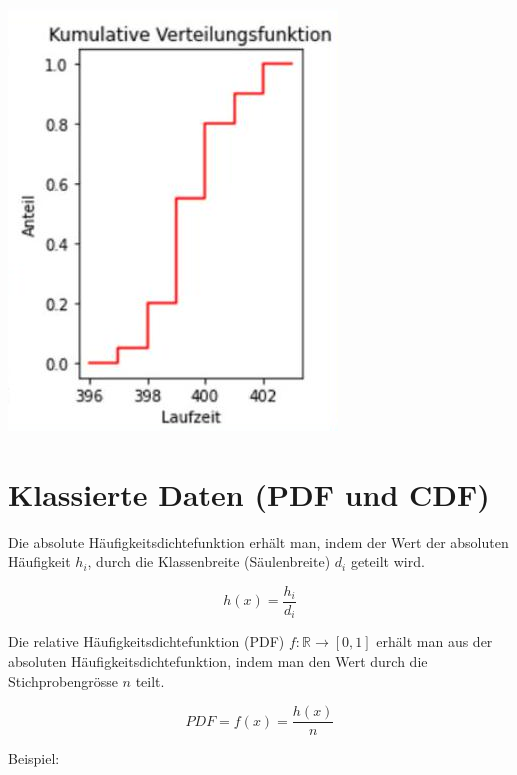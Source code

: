 \documentclass[10pt]{article}
\begin{document}
\begin{center}
\includegraphics[width=\linewidth]{images/2024_12_29_e932069dd64ad17e4875g-02}
\end{center}

\section*{Klassierte Daten (PDF und CDF)}
Die absolute Häufigkeitsdichtefunktion erhält man, indem der Wert der absoluten Häufigkeit $h_{i}$, durch die Klassenbreite (Säulenbreite) $d_{i}$ geteilt wird.

$$
h(x)=\frac{h_{i}}{d_{i}}
$$

Die relative Häufigkeitsdichtefunktion (PDF) $f: \mathbb{R} \rightarrow[0,1]$ erhält man aus der absoluten Häufigkeitsdichtefunktion, indem man den Wert durch die Stichprobengrösse $n$ teilt.

$$
P D F=f(x)=\frac{h(x)}{n}
$$

Beispiel:
\end{document}
